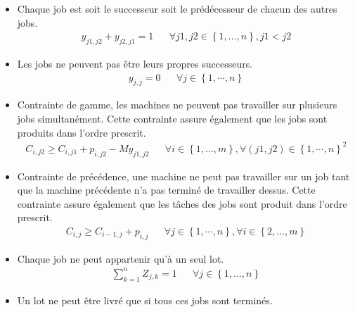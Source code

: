 \documentclass{article}
\begin{document}
        \begin{itemize}
            \item 
                Chaque job est soit le successeur soit le prédécesseur de chacun des autres jobs.
                \begin{align}
                    y_{j1,j2}+y_{j2,j1}=1   &&
                    \forall j1,j2\in\left\{1,\dotsc,n\right\}, j1<j2
                \end{align}
        
            \item 
                Les jobs ne peuvent pas être leurs propres successeurs.
                \begin{align}
                    y_{j,j}=0 &&
                    \forall j\in \left\{1,\cdots, n\right\}
                \end{align}
            \item
        	    Contrainte de gamme, les machines ne peuvent pas travailler sur plusieurs jobs simultanément.
        	    Cette contrainte assure également que les jobs sont produits dans l'ordre prescrit.
        	    \begin{align}
                    C_{i,j2} \geq C_{i,j1}+p_{i,j2}-My_{j1,j2} &&
                    \forall i\in\left\{1,\dotsc,m\right\}, \forall\left(j1,j2\right)\in\left\{1,\cdots,n\right\}^2
        	    \end{align}
            \item
            	Contrainte de précédence, une machine ne peut pas travailler sur un job tant que la machine précédente n’a pas terminé de travailler dessus.
            	Cette contrainte assure également que les tâches des jobs sont produit dans l'ordre prescrit.
            	\begin{align}
                    C_{i,j}\geq C_{i-1,j}+p_{i,j} &&
                    \forall j\in\left\{1,\cdots,n\right\},\forall i\in\left\{2,\dotsc,m\right\}
            	\end{align}
            \item
            	Chaque job ne peut appartenir qu’à un seul lot.
            	\begin{align}
                    \sum_{k=1}^{n}Z_{j,k}=1 &&
                    \forall j \in\left\{1,\dotsc,n \right\}
            	\end{align}
            \item
            	Un lot ne peut être livré que si tous ces jobs sont terminés.
            	\begin{align}

\end{align}
\end{itemize}
\end{document}
